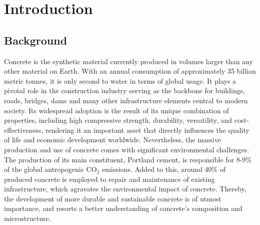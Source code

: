 
\chapter{Introduction} %

\label{Chapter1} %



\section{Background}
Concrete is the synthetic material currently produced in volumes larger than any other material on Earth. With an annual consumption of approximately 35 billion metric tonnes, it is only second to water in terms of global usage\supercite{mehta2014concrete, Monteiro2017}. It plays a pivotal role in the construction industry serving as the backbone for buildings, roads, bridges, dams and many other infrastructure elements central to modern society. Its widespread adoption is the result of its unique combination of properties, including high compressive strength, durability, versatility, and cost-effectiveness\supercite{mehta2014concrete}, rendering it an important asset that directly influences the quality of life and economic development worldwide\supercite{VanDamme2018,Biernacki2017}. Nevertheless, the massive production and use of concrete comes with significant environmental challenges. The production of its main constituent, Portland cement, is responsible for 8-9\% of the global antropogenic CO$_2$ emissions\supercite{Monteiro2017}. Added to this, around 40\% of produced concrete is employed to repair and maintenance of existing infrastructure\supercite{mehta2014concrete}, which agravates the environmental impact of concrete. Thereby, the development of more durable and sustainable concrete is of utmost importance, and resorts a better understanding of concrete's composition and microstructure. 

